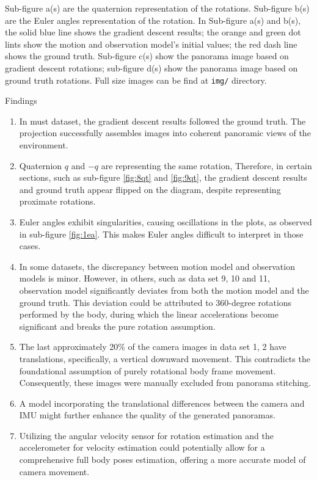 \documentclass[conference]{IEEEtran}
\begin{document}
Sub-figure a(s) are the quaternion representation of the rotations.
Sub-figure b(s) are the Euler angles representation of the rotation.
In Sub-figure a(s) and b(s), the solid blue line shows the gradient descent results;
the orange and green dot lints show the motion and observation model's initial values; 
the red dash line shows the ground truth.
Sub-figure c(s) show the panorama image based on gradient descent rotations;
sub-figure d(s) show the panorama image based on ground truth rotations.
Full size images can be find at \texttt{img/} directory.

Findings
\begin{enumerate}
\item In must dataset, the gradient descent results followed the ground truth.
The projection successfully assembles images into coherent panoramic views of the environment.

\item Quaternion $q$ and $-q$ are representing the same rotation, 
Therefore, in certain sections, such as sub-figure \ref*{fig:8qt} and \ref*{fig:9qt},
the gradient descent results and ground truth appear flipped on the diagram,
despite representing proximate rotations.

\item Euler angles exhibit singularities, causing oscillations in the plots, 
as observed in sub-figure \ref*{fig:1ea}. 
This makes Euler angles difficult to interpret in those cases.

\item In some datasets, the discrepancy between motion model and observation models 
is minor. However, in others, such as data set 9, 10 and 11, 
observation model significantly deviates from both the motion model and the ground truth.
This deviation could be attributed to 360-degree rotations performed by the body, 
during which the linear accelerations become significant and breaks the pure rotation assumption.

\item The last approximately 20\% of the camera images in data set 1, 2 have
translations, specifically, a vertical downward movement.
This contradicts the foundational assumption of purely rotational body frame movement. 
Consequently, these images were manually excluded from panorama stitching.

\item A model incorporating the translational differences between the camera and IMU 
might further enhance the quality of the generated panoramas.

\item Utilizing the angular velocity sensor for rotation estimation and 
the accelerometer for velocity estimation could potentially allow for 
a comprehensive full body poses estimation, 
offering a more accurate model of camera movement.

\end{enumerate}
\end{document}
